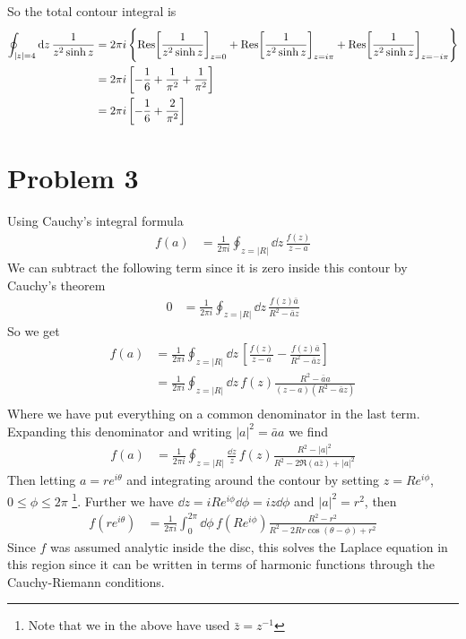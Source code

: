 \documentclass[a4paper,12pt]{article}
\begin{document}
So the total contour integral is
\begin{equation}
	\begin{aligned}
		\oint_{|z|=4}\dd z\,\frac{1}{z^2\sinh z}  &=2\pi i \left\{
		\Res[\frac{1}{z^2\sinh z}]_{z=0}+\Res[\frac{1}{z^2\sinh z}]_{z=i\pi}+\Res[\frac{1}{z^2\sinh z}]_{z=-i\pi}
		\right\}\\
		&=2\pi i \left[-\frac{1}{6}+\frac{1}{\pi^2}+\frac{1}{\pi^2}\right]\\
		&=2\pi i \left[-\frac{1}{6}+\frac{2}{\pi^2}\right]
	\end{aligned}
\end{equation}
\section*{Problem 3}
Using Cauchy's integral formula
\begin{equation}
	\begin{aligned}
f(a)&=\frac{1}{2\pi i}\oint_{z=|R|} \dd z\,\frac{f(z)}{z-a}
	\end{aligned}
\end{equation}
We can subtract the following term since it is zero inside this contour by Cauchy's theorem
\begin{equation}
	\begin{aligned}
		0&=\frac{1}{2\pi i}\oint_{z=|R|} \dd z\,\frac{f(z)\bar a}{ R^2-\bar az}
	\end{aligned}
\end{equation}
So we get
\begin{equation}
	\begin{aligned}
		f(a)&=\frac{1}{2\pi i}\oint_{z=|R|} \dd z\,\left[\frac{f(z)}{z-a}-\frac{f(z)\bar a}{ R^2-\bar az}\right]\\
		&=\frac{1}{2\pi i}\oint_{z=|R|} \dd z\,f(z)\frac{R^2-\bar a a}{(z-a)(R^2-\bar az)}\\
	\end{aligned}
\end{equation}
Where we have put everything on a common denominator in the last term. Expanding this denominator and writing $|a|^2=\bar a a$ we find
\begin{equation}
	\begin{aligned}
		f(a)
		&=\frac{1}{2\pi i}\oint_{z=|R|} \frac{\dd z}{z}\,f(z)\frac{R^2-|a|^2}{R^2-2\Re(a\bar z)+|a|^2}
	\end{aligned}
\end{equation}
Then letting $a=re^{i\theta}$ and integrating around the contour by setting $z=Re^{i\phi}$, $0\leq \phi \leq 2\pi$ \footnote{Note that we in the above have used $\bar z=z^{-1}$}. Further we have $\dd z=iRe^{i\phi}\dd \phi=iz\dd \phi$ and $|a|^2=r^2$, then
\begin{equation}
	\begin{aligned}
f(re^{i\theta})&=\frac{1}{2\pi i}\int_{0}^{2\pi} \dd \phi\,f(Re^{i\phi})\frac{R^2-r^2}{R^2-2Rr\cos(\theta-\phi)+r^2}
	\end{aligned}
\end{equation}
Since $f$ was assumed analytic inside the disc, this solves the Laplace equation in this region since it can be written in terms of harmonic functions through the Cauchy-Riemann conditions.
\end{document}
